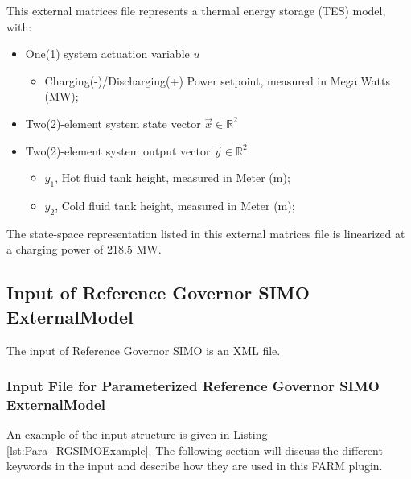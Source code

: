 This external matrices file represents a thermal energy storage (TES) model, with:
\begin{itemize}
  \item One(1) system actuation variable \begin{math} u \end{math}
  \begin{itemize}
    \item Charging(-)/Discharging(+) Power setpoint, measured in Mega Watts (MW);
  \end{itemize}
  \item Two(2)-element system state vector \begin{math} \overrightarrow{x}\in\mathbb{R}^2 \end{math}
  \item Two(2)-element system output vector \begin{math} \overrightarrow{y}\in\mathbb{R}^2 \end{math}
  \begin{itemize}
    \item \begin{math} y_1 \end{math}, Hot fluid tank height, measured in Meter (m);
    \item \begin{math} y_2 \end{math}, Cold fluid tank height, measured in Meter (m);
  \end{itemize}
\end{itemize}

The state-space representation listed in this external matrices file is linearized at a charging power of 218.5 MW.

\subsection{Input of Reference Governor SIMO ExternalModel}
\label{InputFile}
The input of Reference Governor SIMO is an XML file. 

\subsubsection{Input File for Parameterized Reference Governor SIMO ExternalModel}
\label{ParaInputFile}
An example of the input structure is given in Listing \ref{lst:Para_RGSIMOExample}.
The following section will discuss the different keywords in the input and describe how they are used in this FARM plugin.

